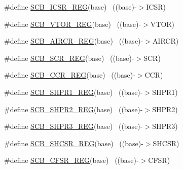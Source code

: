 \begin{DoxyCompactItemize}
\item 
\#define \hyperlink{group___s_c_b___register___accessor___macros_ga32d507fb0a9ba80ad95e451fc93c942a}{S\+C\+B\+\_\+\+I\+C\+S\+R\+\_\+\+R\+EG}(base)                                          ~((base)-\/$>$I\+C\+SR)
\item 
\#define \hyperlink{group___s_c_b___register___accessor___macros_ga882585be47587da934194ffd169da43f}{S\+C\+B\+\_\+\+V\+T\+O\+R\+\_\+\+R\+EG}(base)                                          ~((base)-\/$>$V\+T\+OR)
\item 
\#define \hyperlink{group___s_c_b___register___accessor___macros_ga0510b76b89d5729f2ba9341356553f3e}{S\+C\+B\+\_\+\+A\+I\+R\+C\+R\+\_\+\+R\+EG}(base)                                        ~((base)-\/$>$A\+I\+R\+CR)
\item 
\#define \hyperlink{group___s_c_b___register___accessor___macros_ga6cd310502ec11012af2420c92138fb04}{S\+C\+B\+\_\+\+S\+C\+R\+\_\+\+R\+EG}(base)                                            ~((base)-\/$>$S\+CR)
\item 
\#define \hyperlink{group___s_c_b___register___accessor___macros_gae2955c3c122b0cd8454d0015bcac2780}{S\+C\+B\+\_\+\+C\+C\+R\+\_\+\+R\+EG}(base)                                            ~((base)-\/$>$C\+CR)
\item 
\#define \hyperlink{group___s_c_b___register___accessor___macros_gaabf25516ecaf00639084a339a204456f}{S\+C\+B\+\_\+\+S\+H\+P\+R1\+\_\+\+R\+EG}(base)                                        ~((base)-\/$>$S\+H\+P\+R1)
\item 
\#define \hyperlink{group___s_c_b___register___accessor___macros_gaeb160566ffdd3572f046e69f3b79e3e8}{S\+C\+B\+\_\+\+S\+H\+P\+R2\+\_\+\+R\+EG}(base)                                        ~((base)-\/$>$S\+H\+P\+R2)
\item 
\#define \hyperlink{group___s_c_b___register___accessor___macros_ga8c93949e94df4ece6b4fafd94cca708d}{S\+C\+B\+\_\+\+S\+H\+P\+R3\+\_\+\+R\+EG}(base)                                        ~((base)-\/$>$S\+H\+P\+R3)
\item 
\#define \hyperlink{group___s_c_b___register___accessor___macros_ga84042bf531b908ba8afa2bb260acfdb1}{S\+C\+B\+\_\+\+S\+H\+C\+S\+R\+\_\+\+R\+EG}(base)                                        ~((base)-\/$>$S\+H\+C\+SR)
\item 
\#define \hyperlink{group___s_c_b___register___accessor___macros_ga5e429651ec37af4146f8ac231cb483be}{S\+C\+B\+\_\+\+C\+F\+S\+R\+\_\+\+R\+EG}(base)                                          ~((base)-\/$>$C\+F\+SR)
\item 

\end{DoxyCompactItemize}
